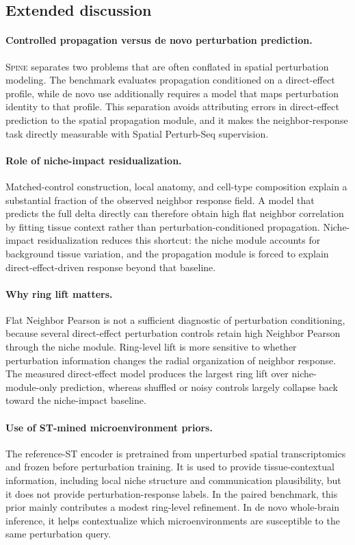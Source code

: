 \documentclass[sigconf,anonymous,review]{acmart}
\newcommand{\methodname}{\textsc{Spine}\xspace}
\begin{document}
\subsection{Extended discussion}
\label{app:extended_discussion}

\paragraph{Controlled propagation versus de novo perturbation prediction.}
\methodname{} separates two problems that are often conflated in spatial perturbation modeling. The benchmark evaluates propagation conditioned on a direct-effect profile, while de novo use additionally requires a model that maps perturbation identity to that profile. This separation avoids attributing errors in direct-effect prediction to the spatial propagation module, and it makes the neighbor-response task directly measurable with Spatial Perturb-Seq supervision.

\paragraph{Role of niche-impact residualization.}
Matched-control construction, local anatomy, and cell-type composition explain a substantial fraction of the observed neighbor response field. A model that predicts the full delta directly can therefore obtain high flat neighbor correlation by fitting tissue context rather than perturbation-conditioned propagation. Niche-impact residualization reduces this shortcut: the niche module accounts for background tissue variation, and the propagation module is forced to explain direct-effect-driven response beyond that baseline.

\paragraph{Why ring lift matters.}
Flat Neighbor Pearson is not a sufficient diagnostic of perturbation conditioning, because several direct-effect perturbation controls retain high Neighbor Pearson through the niche module. Ring-level lift is more sensitive to whether perturbation information changes the radial organization of neighbor response. The measured direct-effect model produces the largest ring lift over niche-module-only prediction, whereas shuffled or noisy controls largely collapse back toward the niche-impact baseline.

\paragraph{Use of ST-mined microenvironment priors.}
The reference-ST encoder is pretrained from unperturbed spatial transcriptomics and frozen before perturbation training. It is used to provide tissue-contextual information, including local niche structure and communication plausibility, but it does not provide perturbation-response labels. In the paired benchmark, this prior mainly contributes a modest ring-level refinement. In de novo whole-brain inference, it helps contextualize which microenvironments are susceptible to the same perturbation query.
\end{document}
